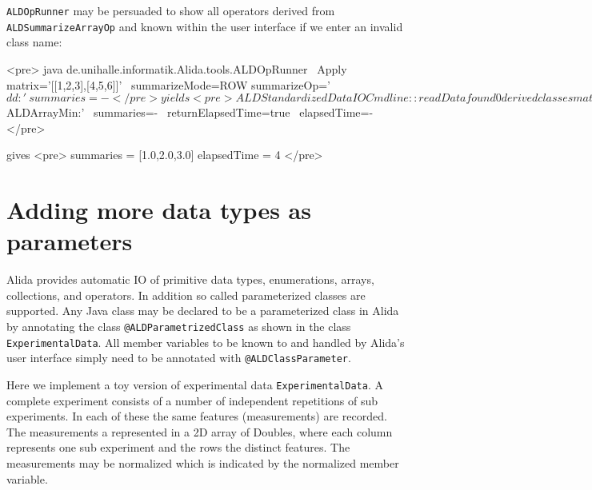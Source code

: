 \lstinline+ALDOpRunner+ may be persuaded to show all operators derived from \lstinline+ALDSummarizeArrayOp+
and known within the user interface if we enter an invalid class name:

<pre>
java de.unihalle.informatik.Alida.tools.ALDOpRunner \
	Apply matrix='[[1,2,3],[4,5,6]]' \
	summarizeMode=ROW summarizeOp='$dd:{}' \
	summaries=-
</pre>

yields

<pre>
ALDStandardizedDataIOCmdline::readData found 0 derived classes matching <dd>
      derived classes available:
	de.unihalle.informatik.Alida.demo.ALDArrayMean
	de.unihalle.informatik.Alida.demo.ALDArrayMin
	de.unihalle.informatik.Alida.demo.ALDArraySum
ERROR: reading parameter <summarizeOp> returns null
</pre>


Supplemental parameters are handled like other parameters

<pre>
java de.unihalle.informatik.Alida.tools.ALDOpRunner Apply \
	matrix='[[1,2,3],[4,5,6]]' \
	summarizeMode=COLUMN \
	summarizeOp='$ALDArrayMin:{}' \
	summaries=- \
	returnElapsedTime=true \
	elapsedTime=-
</pre>

gives
<pre>
	summaries = [1.0,2.0,3.0]
	elapsedTime = 4
</pre>



\section{  Adding more data types as parameters}

Alida provides automatic IO of primitive data types, enumerations, arrays, collections,
and operators.
In addition so called parameterized classes are supported.
Any Java class may be declared to be a parameterized class in Alida
by annotating the class \lstinline+@ALDParametrizedClass+ as shown in the
class \lstinline+ExperimentalData+.
All member variables to be known to and handled by Alida's user interface
simply need to be annotated with \lstinline+@ALDClassParameter+.

Here we implement a toy version of experimental data \lstinline+ExperimentalData+.
A complete experiment consists of a number of independent repetitions of
sub experiments. 
In each of these the same features (measurements) are recorded.
The measurements a represented in 
a 2D array of Doubles, where each column represents
one sub experiment and the rows the distinct features.
The measurements may be normalized which is indicated by the
normalized member variable.

